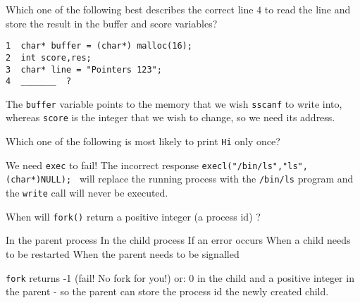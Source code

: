 
\variant
Which one of the following best describes the correct line $4$  to read the line and store the result in the buffer and score variables?
\begin{verbatim}
1  char* buffer = (char*) malloc(16);
2  int score,res;
3  char* line = "Pointers 123";
4  _______  ?
\end{verbatim}
\begin{answers}
\end{answers}
\begin{solution}
The {\tt buffer} variable points to the memory that we wish {\tt sscanf} to write into, whereas {\tt score} is the integer that we wish to change, so we need its address.
\end{solution}


\variant
Which one of the following is most likely to print {\tt Hi} only once?
\begin{answers}
\end{answers}
\begin{solution}
We need {\tt exec} to fail! The incorrect response {\tt execl("/bin/ls","ls",(char*)NULL); } will replace the running process with the {\tt /bin/ls} program and the {\tt write} call will never be executed.
\end{solution}



\variant
When will {\tt fork()} return a positive integer (a process id) ?
\begin{answers}
\correctanswer In the parent process
\answer In the child process
\answer If an error occurs
\answer When a child needs to be restarted
\answer When the parent needs to be signalled
\end{answers}
\begin{solution}
{\tt fork} returns -1 (fail! No fork for you!) or: 0 in the child and a positive integer in the parent -  so the parent can store the process id the newly created child.
\end{solution}

